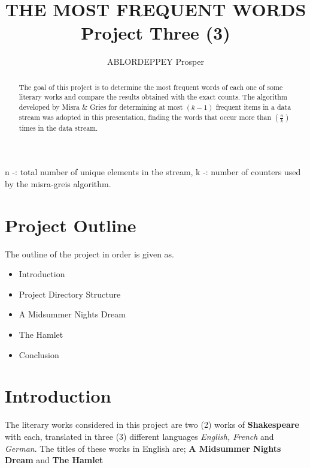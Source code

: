 \documentclass[longpaper, english, final, times]{revdetua}
\begin{document}
	
	
	\title{THE MOST FREQUENT WORDS\\Project Three (3)}
	\author{ABLORDEPPEY Prosper} %
	\maketitle
	
	\begin{abstract}%
		The goal of this project is to determine the most frequent words of each one of some literary works and compare the results obtained with the exact counts. The algorithm developed by Misra \& Gries for determining at most $(k-1)$ frequent items in a data stream was adopted in this presentation,
		finding the words that occur more than $\left(\frac{n}{k}\right)$ times in the data stream.
	\end{abstract}

	\begin{keywords}
		n -: total number of unique elements in the stream, k -: number of counters used by the misra-greis algorithm.
	\end{keywords}
	
	\section*{Project Outline}
		The outline of the project in order is given as.
		\begin{itemize}
			\item Introduction
			\item Project Directory Structure
			\item A Midsummer Nights Dream
			\item The Hamlet
			\item Conclusion
		\end{itemize}
	
	\section{Introduction}
		The literary works considered in this project are two (2) works of \textbf{Shakespeare} with each, translated in three (3) different languages \textit{English, French} and \textit{German}.
		The titles of these works in English are;
		\textbf{A Midsummer Nights Dream} and \textbf{The Hamlet}
	
		
\end{document}
